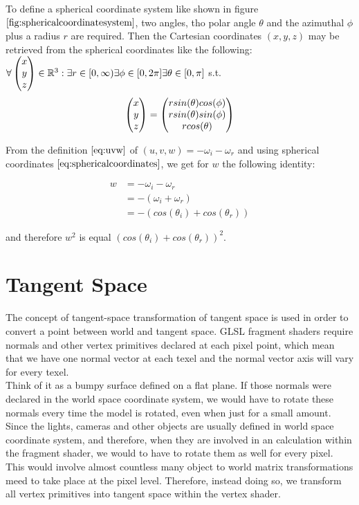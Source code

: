 To define a spherical coordinate system like shown in figure $\ref{fig:sphericalcoordinatesystem}$, two angles, tho polar angle $\theta$ and the azimuthal $\phi$ plus a radius $r$ are required. Then the Cartesian coordinates $(x,y,z)$ may be retrieved from the spherical coordinates like the following: $\forall \colvec[x]{y}{z} \in \mathbb{R}^3 : \exists r \in [0,\infty) \exists \phi \in [0,2\pi] \exists \theta \in [0,\pi] $ s.t.
\begin{equation*}
\colvec[x]{y}{z} = \colvec[r sin(\theta)cos(\phi)]{r sin(\theta)sin(\phi)}{r cos(\theta)}
\label{eq:sphericalcoordinates}
\end{equation*}

\label{sec:componentw}
From the definition $\ref{eq:uvw}$ of $(u,v,w)= -\omega_i - \omega_r$ and using spherical coordinates $\ref{eq:sphericalcoordinates}$, we get for $w$ the following identity:

\begin{align}
w 
&= -\omega_i - \omega_r \nonumber \\ 
&= -(\omega_i + \omega_r) \nonumber \\
&= -\left( cos(\theta_i)+cos(\theta_r) \right) 
\label{eq:sphericalomega}
\end{align}

and therefore $w^2$ is equal $(cos(\theta_i)+cos(\theta_r))^2$. 

\section{Tangent Space}
\label{sec:tangentspace}
The concept of tangent-space transformation of tangent space is used in order to convert a point between world and tangent space. GLSL fragment shaders require normals and other vertex primitives declared at each pixel point, which mean that we have one normal vector at each texel and the normal vector axis will vary for every texel. \\

Think of it as a bumpy surface defined on a flat plane. If those normals were declared in the world space coordinate system, we would have to rotate these normals every time the model is rotated, even when just for a small amount. Since the lights, cameras and other objects are usually defined in world space coordinate system, and therefore, when they are involved in an calculation within the fragment shader, we would to have to rotate them as well for every pixel. This would involve almost countless many object to world matrix transformations meed to take place at the pixel level. Therefore, instead doing so, we transform all vertex primitives into tangent space within the vertex shader. \\

